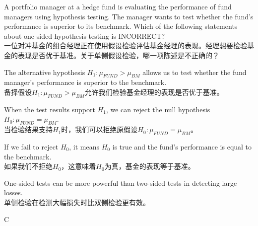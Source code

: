 \documentclass{article}
\newcounter{question} %
\begin{document}
\begin{question}
A portfolio manager at a hedge fund is evaluating the performance of fund managers using hypothesis testing. The manager wants to test whether the fund's performance is superior to its benchmark. Which of the following statements about one-sided hypothesis testing is INCORRECT?\\
一位对冲基金的组合经理正在使用假设检验评估基金经理的表现。经理想要检验基金的表现是否优于基准。关于单侧假设检验，哪一项陈述是不正确的？
\end{question}

\begin{choices}
    \item The alternative hypothesis \(H_1: \mu_{FUND} > \mu_{BM}\) allows us to test whether the fund manager's performance is superior to the benchmark.\\
    备择假设\(H_1: \mu_{FUND} > \mu_{BM}\)允许我们检验基金经理的表现是否优于基准。
    \item When the test results support \(H_1\), we can reject the null hypothesis \(H_0: \mu_{FUND} = \mu_{BM}\).\\
    当检验结果支持\(H_1\)时，我们可以拒绝原假设\(H_0: \mu_{FUND} = \mu_{BM}\)。
    \item If we fail to reject \(H_0\), it means \(H_0\) is true and the fund's performance is equal to the benchmark.\\    
    如果我们不拒绝\(H_0\)，这意味着\(H_0\)为真，基金的表现等于基准。
    \item One-sided tests can be more powerful than two-sided tests in detecting large losses.\\
    单侧检验在检测大幅损失时比双侧检验更有效。
\end{choices}

\begin{correctanswer}
    C
\end{correctanswer}
\end{document}
